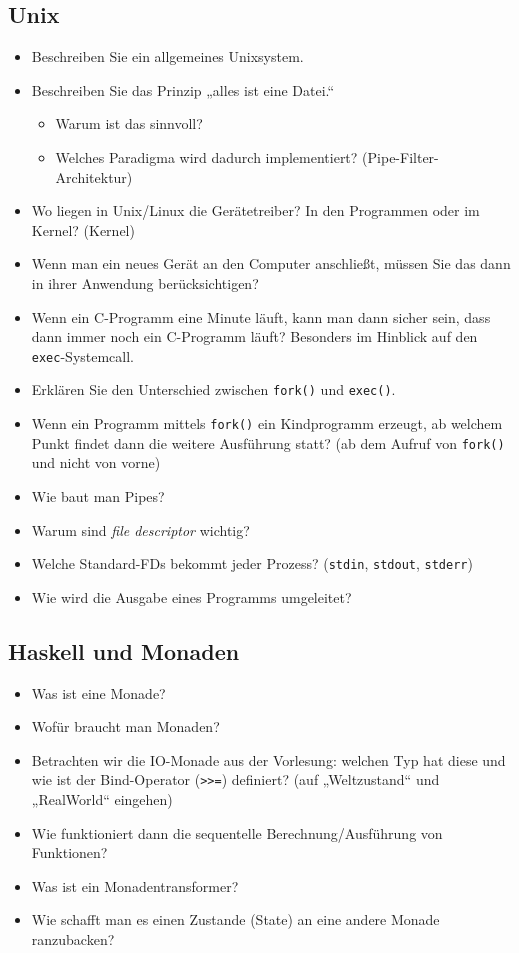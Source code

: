 \documentclass[
  a4paper,
  11pt,
]{article}
\title{}
\author{}
\begin{document}
\thispagestyle{fancy}

\subsection*{Unix}
\label{sub:Unix}

\begin{itemize}
  \item Beschreiben Sie ein allgemeines Unixsystem.
  \item Beschreiben Sie das Prinzip „alles ist eine Datei.“
    \begin{itemize}
      \item Warum ist das sinnvoll?
      \item Welches Paradigma wird dadurch implementiert?
        (Pipe-Filter-Architektur)
    \end{itemize}
  \item Wo liegen in Unix/Linux die Gerätetreiber? In den Programmen oder im
    Kernel? (Kernel)
  \item Wenn man ein neues Gerät an den Computer anschließt, müssen Sie das dann
    in ihrer Anwendung berücksichtigen?
  \item Wenn ein C-Programm eine Minute läuft, kann man dann sicher sein, dass
    dann immer noch ein C-Programm läuft? Besonders im Hinblick auf den
    \texttt{exec}-Systemcall.
  \item Erklären Sie den Unterschied zwischen \texttt{fork()} und
    \texttt{exec()}.
  \item Wenn ein Programm mittels \texttt{fork()} ein Kindprogramm erzeugt, ab
    welchem Punkt findet dann die weitere Ausführung statt? (ab dem Aufruf von
    \texttt{fork()} und nicht von vorne)
  \item Wie baut man Pipes?
  \item Warum sind \textit{file descriptor} wichtig?
  \item Welche Standard-FDs bekommt jeder Prozess? (\texttt{stdin},
    \texttt{stdout}, \texttt{stderr})
  \item Wie wird die Ausgabe eines Programms umgeleitet?
\end{itemize}

\subsection*{Haskell und Monaden}
\label{sub:Haskell und Monaden}

\begin{itemize}
  \item Was ist eine Monade?
  \item Wofür braucht man Monaden?
  \item Betrachten wir die IO-Monade aus der Vorlesung: welchen Typ hat diese
    und wie ist der Bind-Operator (\texttt{>>=}) definiert? (auf „Weltzustand“
    und „RealWorld“ eingehen)
  \item Wie funktioniert dann die sequentelle Berechnung/Ausführung von
    Funktionen?
  \item Was ist ein Monadentransformer?
  \item Wie schafft man es einen Zustande (State) an eine andere Monade
    ranzubacken?
\end{itemize}
\end{document}
